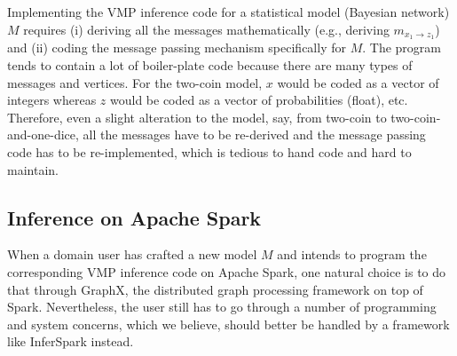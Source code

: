 Implementing the VMP inference code for a statistical model 
(Bayesian network) $M$
requires (i) deriving all the messages mathematically  (e.g., deriving $m_{x_1 \rightarrow z_1}$)
and (ii) coding the message passing mechanism specifically for $M$.
The program tends to contain a lot of boiler-plate code 
because there are many types of messages and vertices.
For the two-coin model, 
$x$ would be coded as a vector of integers 
whereas $z$ would be coded as a vector of probabilities (float), etc.
Therefore, even a slight alteration to the model, say, from two-coin to 
two-coin-and-one-dice, all the messages have to be re-derived 
and the message passing code has to be re-implemented, which is tedious
to hand code and hard to maintain.


%




\subsection{Inference on Apache Spark}
When a domain user has crafted a new model $M$
and intends to program 
the corresponding VMP inference code on Apache Spark,
one natural choice is to do that through GraphX, the distributed graph processing framework on top of Spark.
Nevertheless, the user still has to go through a number of programming and system concerns,
which we believe, should better be handled by a framework like InferSpark instead.

